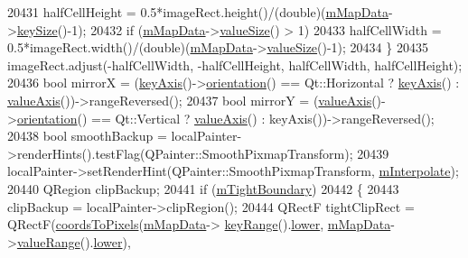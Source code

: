 \begin{DoxyCode}
20431       halfCellHeight = 0.5*imageRect.height()/(double)(\hyperlink{class_q_c_p_color_map_a8709272aa8f0be3ca111bf3866806f8b}{mMapData}->\hyperlink{class_q_c_p_color_map_data_aa8d7811686fdfea964947715210c4af8}{keySize}()-1);
20432     \textcolor{keywordflow}{if} (\hyperlink{class_q_c_p_color_map_a8709272aa8f0be3ca111bf3866806f8b}{mMapData}->\hyperlink{class_q_c_p_color_map_data_ab880be6bc587f34e8d22fe77ef6b57e9}{valueSize}() > 1)
20433       halfCellWidth = 0.5*imageRect.width()/(double)(\hyperlink{class_q_c_p_color_map_a8709272aa8f0be3ca111bf3866806f8b}{mMapData}->\hyperlink{class_q_c_p_color_map_data_ab880be6bc587f34e8d22fe77ef6b57e9}{valueSize}()-1);
20434   \}
20435   imageRect.adjust(-halfCellWidth, -halfCellHeight, halfCellWidth, halfCellHeight);
20436   \textcolor{keywordtype}{bool} mirrorX = (\hyperlink{class_q_c_p_abstract_plottable_a72c7a09c22963f2c943f07112b311103}{keyAxis}()->\hyperlink{class_q_c_p_axis_a57483f2f60145ddc9e63f3af53959265}{orientation}() == Qt::Horizontal ? 
      \hyperlink{class_q_c_p_abstract_plottable_a72c7a09c22963f2c943f07112b311103}{keyAxis}() : \hyperlink{class_q_c_p_abstract_plottable_a3106f9d34d330a6097a8ec5905e5b519}{valueAxis}())->rangeReversed();
20437   \textcolor{keywordtype}{bool} mirrorY = (\hyperlink{class_q_c_p_abstract_plottable_a3106f9d34d330a6097a8ec5905e5b519}{valueAxis}()->\hyperlink{class_q_c_p_axis_a57483f2f60145ddc9e63f3af53959265}{orientation}() == Qt::Vertical ? 
      \hyperlink{class_q_c_p_abstract_plottable_a3106f9d34d330a6097a8ec5905e5b519}{valueAxis}() : keyAxis())->rangeReversed();
20438   \textcolor{keywordtype}{bool} smoothBackup = localPainter->renderHints().testFlag(QPainter::SmoothPixmapTransform);
20439   localPainter->setRenderHint(QPainter::SmoothPixmapTransform, \hyperlink{class_q_c_p_color_map_af77e5eba9a844592648edeb6fbe834f1}{mInterpolate});
20440   QRegion clipBackup;
20441   \textcolor{keywordflow}{if} (\hyperlink{class_q_c_p_color_map_ac2e9425fe4381b496726e1c09f978302}{mTightBoundary})
20442   \{
20443     clipBackup = localPainter->clipRegion();
20444     QRectF tightClipRect = QRectF(\hyperlink{class_q_c_p_abstract_plottable_ade710a776104b14c1c835168ce1bfc5c}{coordsToPixels}(\hyperlink{class_q_c_p_color_map_a8709272aa8f0be3ca111bf3866806f8b}{mMapData}->
      \hyperlink{class_q_c_p_color_map_data_a4765180639742460f64ab6c97c745c08}{keyRange}().\hyperlink{class_q_c_p_range_aa3aca3edb14f7ca0c85d912647b91745}{lower}, \hyperlink{class_q_c_p_color_map_a8709272aa8f0be3ca111bf3866806f8b}{mMapData}->\hyperlink{class_q_c_p_color_map_data_a025be4d7ba0494fd7b38a5a56c737f2a}{valueRange}().\hyperlink{class_q_c_p_range_aa3aca3edb14f7ca0c85d912647b91745}{lower}),

\end{DoxyCode}
